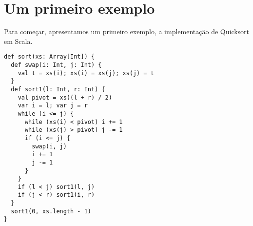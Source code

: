 \def\exercise{
   \def\theresult{Exercise~\thesection.\arabic{result}}
   \refstepcounter{result}
   \trivlist\item[\hskip
   \labelsep{\bf \theresult}]}
\def\endexercise{\endtrivlist}
 
\newcommand{\rewriteby}[1]{\mbox{\tab\tab\rm(#1)}}

\chapter{\label{chap:example-one}Um primeiro exemplo}

Para come\c{c}ar, apresentamos um primeiro exemplo, a implementa\c{c}\~{a}o de Quicksort em Scala.

\begin{lstlisting}
def sort(xs: Array[Int]) {
  def swap(i: Int, j: Int) {
    val t = xs(i); xs(i) = xs(j); xs(j) = t
  }
  def sort1(l: Int, r: Int) {
    val pivot = xs((l + r) / 2)
    var i = l; var j = r
    while (i <= j) {
      while (xs(i) < pivot) i += 1
      while (xs(j) > pivot) j -= 1
      if (i <= j) { 
        swap(i, j)
        i += 1
        j -= 1
      }
    } 
    if (l < j) sort1(l, j)
    if (j < r) sort1(i, r)
  }
  sort1(0, xs.length - 1)
}
\end{lstlisting}

